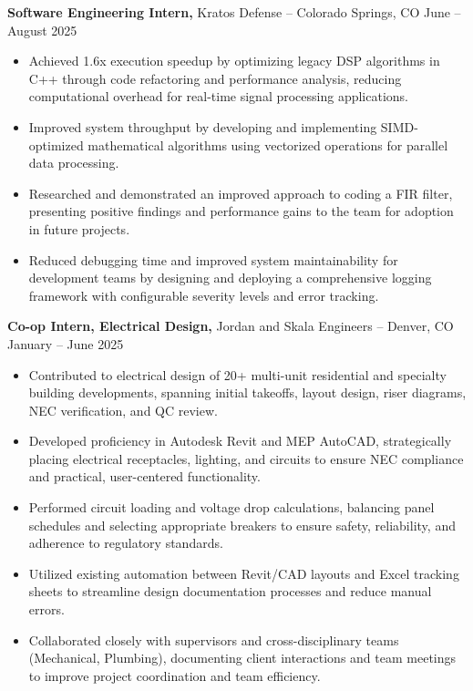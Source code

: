 \documentclass[11pt]{article}
\begin{document}
\textbf{Software Engineering Intern, }{Kratos Defense} -- Colorado Springs, CO \hfill June -- August 2025 \\
\vspace{-5pt}
\begin{itemize}
  \item Achieved 1.6x execution speedup by optimizing legacy DSP algorithms in C++ through code refactoring and performance analysis, reducing computational overhead for real-time signal processing applications.
  \item Improved system throughput by developing and implementing SIMD-optimized mathematical algorithms using vectorized operations for parallel data processing.
  \item Researched and demonstrated an improved approach to coding a FIR filter, presenting positive findings and performance gains to the team for adoption in future projects.
  \item Reduced debugging time and improved system maintainability for development teams by designing and deploying a comprehensive logging framework with configurable severity levels and error tracking.
\end{itemize}

\textbf{Co-op Intern, Electrical Design, }{Jordan and Skala Engineers} -- Denver, CO \hfill January -- June 2025 \\
\vspace{-5pt}
\begin{itemize}
  \item Contributed to electrical design of 20+ multi-unit residential and specialty building developments, spanning initial takeoffs, layout design, riser diagrams, NEC verification, and QC review.
  \item Developed proficiency in Autodesk Revit and MEP AutoCAD, strategically placing electrical receptacles, lighting, and circuits to ensure NEC compliance and practical, user-centered functionality.
  \item Performed circuit loading and voltage drop calculations, balancing panel schedules and selecting appropriate breakers to ensure safety, reliability, and adherence to regulatory standards.
  \item Utilized existing automation between Revit/CAD layouts and Excel tracking sheets to streamline design documentation processes and reduce manual errors.
  \item Collaborated closely with supervisors and cross-disciplinary teams (Mechanical, Plumbing), documenting client interactions and team meetings to improve project coordination and team efficiency.
\end{itemize}
\end{document}
